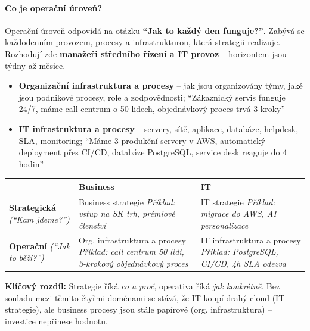 \paragraph{Co je operační úroveň?}
Operační úroveň odpovídá na otázku \textbf{``Jak to každý den funguje?''}.
Zabývá se každodenním provozem, procesy a infrastrukturou, která strategii realizuje.
Rozhodují zde \textbf{manažeři středního řízení a IT provoz} -- horizontem jsou týdny až měsíce.

\begin{itemize}
  \item \textbf{Organizační infrastruktura a procesy} -- jak jsou organizovány týmy, jaké jsou
    podnikové procesy, role a zodpovědnosti; ``Zákaznický servis funguje 24/7, máme
    call centrum o 50 lidech, objednávkový proces trvá 3 kroky''
  \item \textbf{IT infrastruktura a procesy} -- servery, sítě, aplikace, databáze, helpdesk,
    SLA, monitoring; ``Máme 3 produkční servery v AWS, automatický deployment přes CI/CD,
    databáze PostgreSQL, service desk reaguje do 4 hodin''
\end{itemize}

\begin{center}
\begin{tabular}{p{3cm}p{5cm}p{5cm}}
\toprule
 & \textbf{Business} & \textbf{IT} \\
\midrule
\textbf{Strategická} \newline \textit{(``Kam jdeme?'')} &
  Business strategie \newline \textit{Příklad: vstup na SK trh, prémiové členství} &
  IT strategie \newline \textit{Příklad: migrace do AWS, AI personalizace} \\
\midrule
\textbf{Operační} \newline \textit{(``Jak to běží?'')} &
  Org. infrastruktura a procesy \newline \textit{Příklad: call centrum 50 lidí, 3-krokový objednávkový proces} &
  IT infrastruktura a procesy \newline \textit{Příklad: PostgreSQL, CI/CD, 4h SLA odezva} \\
\bottomrule
\end{tabular}
\end{center}

\textbf{Klíčový rozdíl:} Strategie říká \textit{co a proč}, operativa říká \textit{jak konkrétně}.
Bez souladu mezi těmito čtyřmi doménami se stává, že IT koupí drahý cloud (IT strategie),
ale business procesy jsou stále papírové (org. infrastruktura) -- investice nepřinese hodnotu.

